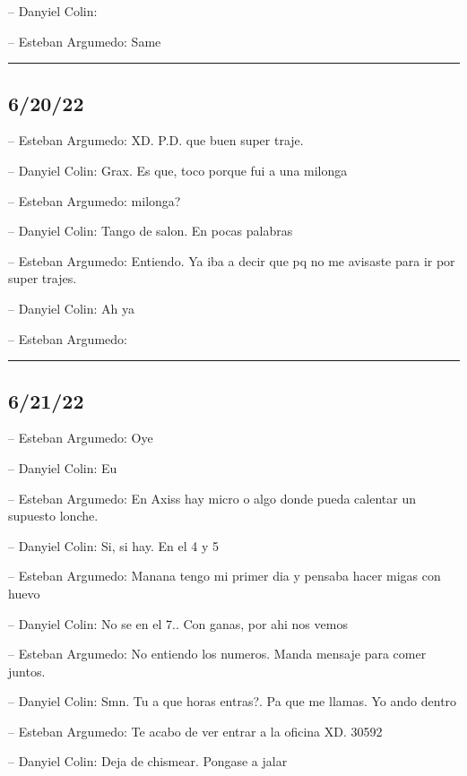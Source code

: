 -- Danyiel Colin:

-- Esteban Argumedo: Same

\begin{center}\rule{0.5\linewidth}{0.5pt}\end{center}

\hypertarget{section-107}{%
\subsection{6/20/22}\label{section-107}}

-- Esteban Argumedo: XD. P.D. que buen super traje.

-- Danyiel Colin: Grax. Es que, toco porque fui a una milonga

-- Esteban Argumedo: milonga?

-- Danyiel Colin: Tango de salon. En pocas palabras

-- Esteban Argumedo: Entiendo. Ya iba a decir que pq no me avisaste para
ir por super trajes.

-- Danyiel Colin: Ah ya

-- Esteban Argumedo:

\begin{center}\rule{0.5\linewidth}{0.5pt}\end{center}

\hypertarget{section-108}{%
\subsection{6/21/22}\label{section-108}}

-- Esteban Argumedo: Oye

-- Danyiel Colin: Eu

-- Esteban Argumedo: En Axiss hay micro o algo donde pueda calentar un
supuesto lonche.

-- Danyiel Colin: Si, si hay. En el 4 y 5

-- Esteban Argumedo: Manana tengo mi primer dia y pensaba hacer migas
con huevo

-- Danyiel Colin: No se en el 7.. Con ganas, por ahi nos vemos

-- Esteban Argumedo: No entiendo los numeros. Manda mensaje para comer
juntos.

-- Danyiel Colin: Smn. Tu a que horas entras?. Pa que me llamas. Yo ando
dentro

-- Esteban Argumedo: Te acabo de ver entrar a la oficina XD. 30592

-- Danyiel Colin: Deja de chismear. Pongase a jalar

